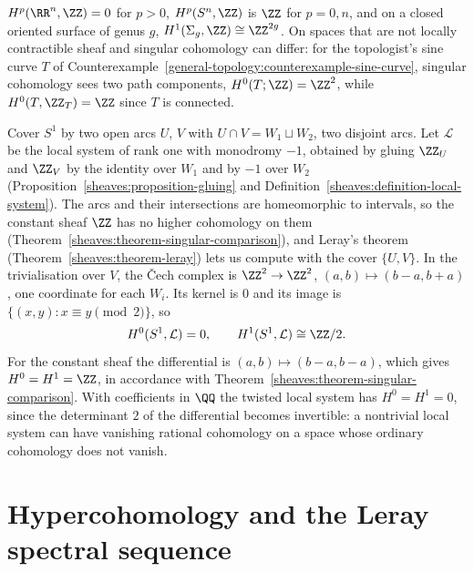 \begin{example}\label{sheaves:example-constant-sheaf-cohomology}
$H^p(\RR^n, \ZZ) = 0$ for $p > 0$, $H^p(S^n, \ZZ)$ is $\ZZ$ for $p = 0, n$, and on a closed oriented surface of genus $g$, $H^1(\Sigma_g, \ZZ) \cong \ZZ^{2g}$. On spaces that are not locally
contractible sheaf and singular cohomology can differ: for the topologist's sine curve $T$ of Counterexample~\ref{general-topology:counterexample-sine-curve}, singular cohomology sees two
path components, $H^0(T; \ZZ) = \ZZ^2$, while $H^0(T, \ZZ_T) = \ZZ$ since $T$ is connected.
\end{example}

\begin{example}\label{sheaves:example-mobius-local-system}
Cover $S^1$ by two open arcs $U$, $V$ with $U \cap V = W_1 \sqcup W_2$, two disjoint arcs. Let $\mathcal{L}$ be the local system of rank one with monodromy $-1$, obtained by gluing $\ZZ_U$ and $\ZZ_V$ by the identity over
$W_1$ and by $-1$ over $W_2$ (Proposition~\ref{sheaves:proposition-gluing} and Definition~\ref{sheaves:definition-local-system}). The arcs and their intersections are homeomorphic to intervals, so the constant sheaf $\ZZ$ has no
higher cohomology on them (Theorem~\ref{sheaves:theorem-singular-comparison}), and Leray's theorem (Theorem~\ref{sheaves:theorem-leray}) lets us compute with the cover $\{U, V\}$. In the trivialisation over $V$,
the \v{C}ech complex is $\ZZ^2 \to \ZZ^2$, $(a, b) \mapsto (b - a, b + a)$, one coordinate for each $W_i$. Its kernel is $0$ and its image is $\{(x, y) : x \equiv y \pmod 2\}$, so
\[
H^0(S^1, \mathcal{L}) = 0, \qquad H^1(S^1, \mathcal{L}) \cong \ZZ/2 .
\]
For the constant sheaf the differential is $(a, b) \mapsto (b - a, b - a)$, which gives $H^0 = H^1 = \ZZ$, in accordance with Theorem~\ref{sheaves:theorem-singular-comparison}. With coefficients in $\QQ$ the twisted local system
has $H^0 = H^1 = 0$, since the determinant $2$ of the differential becomes invertible: a nontrivial local system can have vanishing rational cohomology on a space whose ordinary cohomology does not vanish.
\end{example}

\section{Hypercohomology and the Leray spectral sequence}\label{sheaves:section-hypercohomology}


